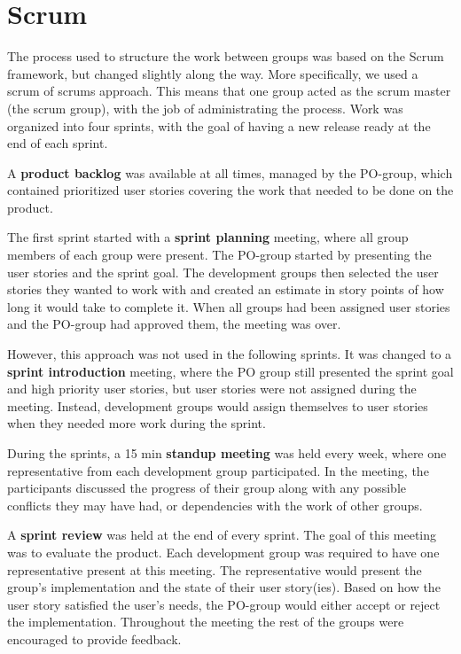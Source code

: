 \section{Scrum}
\label{sect:Scrum}
The process used to structure the work between groups was based on the Scrum framework, but changed slightly along the way. More specifically, we used a scrum of scrums approach. This means that one group acted as the scrum master (the scrum group), with the job of administrating the process. 
Work was organized into four sprints, with the goal of having a new release ready at the end of each sprint. 

A \textbf{product backlog} was available at all times, managed by the PO-group, which contained prioritized user stories covering the work that needed to be done on the product.

The first sprint started with a \textbf{sprint planning} meeting, where all group members of each group were present. The PO-group started by presenting the user stories and the sprint goal. The development groups then selected the user stories they wanted to work with and created an estimate in story points of how long it would take to complete it. When all groups had been assigned user stories and the PO-group had approved them, the meeting was over. 

However, this approach was not used in the following sprints. It was changed to a \textbf{sprint introduction} meeting, where the PO group still presented the sprint goal and high priority user stories, but user stories were not assigned during the meeting. Instead, development groups would assign themselves to user stories when they needed more work during the sprint. 

During the sprints, a 15 min \textbf{standup meeting} was held every week, where one representative from each development group participated. In the meeting, the participants discussed the progress of their group along with any possible conflicts they may have had, or dependencies with the work of other groups.

A \textbf{sprint review} was held at the end of every sprint. The goal of this meeting was to evaluate the product. Each development group was required to have one representative present at this meeting. The representative would present the group's implementation and the state of their user story(ies). Based on how the user story satisfied the user's needs, the PO-group would either accept or reject the implementation.
Throughout the meeting the rest of the groups were encouraged to provide feedback.

